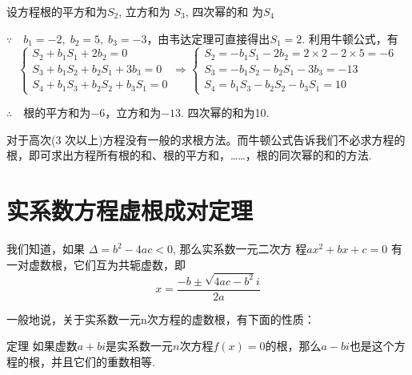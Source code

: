 \begin{solution}
    设方程根的平方和为$S_2$, 立方和为 $S_3$, 四次幂的和
为$S_{4}$

$\because\quad b_1=-2, \; b_2=5,\; b_3=-3$，由韦达定理可直接得出$S_{1}=2$. 利用牛顿公式，有
\[\begin{cases}
    S_{2}+ b_{1}S_{1}+ 2b_{2}= 0\\
    S_{3}+ b_{1}S_{2}+ b_{2}S_{1}+ 3b_{3}= 0\\
    S_4+ b_1S_3+ b_2S_2+ b_3S_1= 0
\end{cases}\Longrightarrow \begin{cases}
    S_{2}= - b_{1}S_{1}- 2b_{2}=2\times2-2\times5=-6\\
    S_3=- b_{1}S_{2}- b_{2}S_{1}- 3b_{3}
    =-13\\
    S_4= b_1S_3- b_2S_2- b_3S_1 =10
\end{cases}\]

$\therefore\quad $根的平方和为$-6$，立方和为$-13$. 
四次幂的和为10.
\end{solution}

\begin{rmk}
    对于高次(3 次以上)方程没有一般的求根方法。而牛顿公式告诉我们不必求方程的根，即可求出方程所有根的和、根的平方和，……，根的同次幂的和的方法.
\end{rmk}

\section{实系数方程虚根成对定理}

我们知道，如果 $\Delta=b^2-4ac<0$, 那么实系数一元二次方
程$ax^{2}+bx+c=0$ 有一对虚数根，它们互为共轭虚数，即
$$x=\frac{-b\pm\sqrt{4ac-b^{2}}i}{2a}$$

一般地说，关于实系数一元n次方程的虚数根，有下面的性质：

\begin{thm}
   {定理} 如果虚数$a+bi$是实系数一元$n$次方程$f(x)=0$的根，那么$a-bi$也是这个方程的根，并且它们的重数相等. 
\end{thm}

